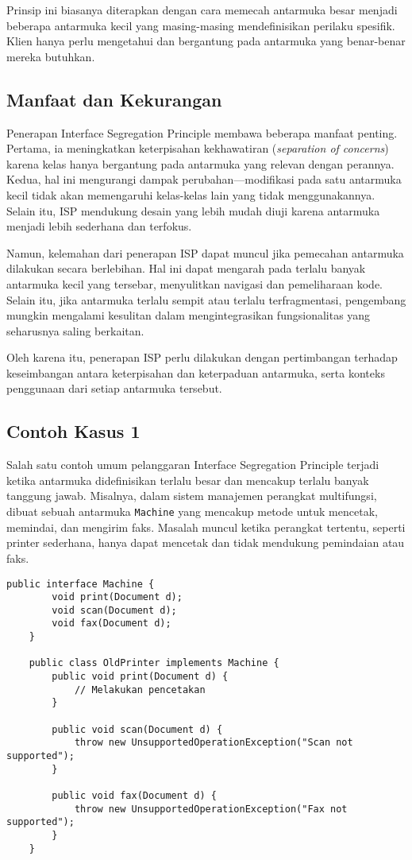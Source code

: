 Prinsip ini biasanya diterapkan dengan cara memecah antarmuka besar menjadi beberapa antarmuka kecil yang masing-masing mendefinisikan perilaku spesifik. Klien hanya perlu mengetahui dan bergantung pada antarmuka yang benar-benar mereka butuhkan.

\subsection{Manfaat dan Kekurangan}
Penerapan Interface Segregation Principle membawa beberapa manfaat penting. Pertama, ia meningkatkan keterpisahan kekhawatiran (\textit{separation of concerns}) karena kelas hanya bergantung pada antarmuka yang relevan dengan perannya. Kedua, hal ini mengurangi dampak perubahan—modifikasi pada satu antarmuka kecil tidak akan memengaruhi kelas-kelas lain yang tidak menggunakannya. Selain itu, ISP mendukung desain yang lebih mudah diuji karena antarmuka menjadi lebih sederhana dan terfokus.

Namun, kelemahan dari penerapan ISP dapat muncul jika pemecahan antarmuka dilakukan secara berlebihan. Hal ini dapat mengarah pada terlalu banyak antarmuka kecil yang tersebar, menyulitkan navigasi dan pemeliharaan kode. Selain itu, jika antarmuka terlalu sempit atau terlalu terfragmentasi, pengembang mungkin mengalami kesulitan dalam mengintegrasikan fungsionalitas yang seharusnya saling berkaitan.

Oleh karena itu, penerapan ISP perlu dilakukan dengan pertimbangan terhadap keseimbangan antara keterpisahan dan keterpaduan antarmuka, serta konteks penggunaan dari setiap antarmuka tersebut.

\subsection{Contoh Kasus 1}
Salah satu contoh umum pelanggaran Interface Segregation Principle terjadi ketika antarmuka didefinisikan terlalu besar dan mencakup terlalu banyak tanggung jawab. Misalnya, dalam sistem manajemen perangkat multifungsi, dibuat sebuah antarmuka \texttt{Machine} yang mencakup metode untuk mencetak, memindai, dan mengirim faks. Masalah muncul ketika perangkat tertentu, seperti printer sederhana, hanya dapat mencetak dan tidak mendukung pemindaian atau faks.

\begin{lstlisting}[style=JavaStyle, caption={Contoh pelanggaran ISP}]
	public interface Machine {
		void print(Document d);
		void scan(Document d);
		void fax(Document d);
	}
	
	public class OldPrinter implements Machine {
		public void print(Document d) {
			// Melakukan pencetakan
		}
		
		public void scan(Document d) {
			throw new UnsupportedOperationException("Scan not supported");
		}
		
		public void fax(Document d) {
			throw new UnsupportedOperationException("Fax not supported");
		}
	}
\end{lstlisting}

